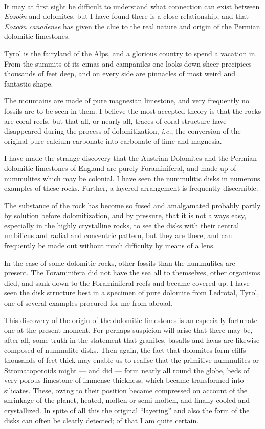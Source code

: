 \documentclass[a4paper, 12pt, oneside]{article}
\begin{document}
\paragraph{}
It may at first sight be difficult to understand what connection can exist between \emph{Eozoön} and dolomites, but I have found there is a close relationship, and that \emph{Eozoön canadense} has given the clue to the real nature and origin of the Permian dolomitic limestones.

Tyrol is the fairyland of the Alps, and a glorious country to spend a vacation in. From the summits of its cimas and campaniles one looks down sheer precipices thousands of feet deep, and on every side are pinnacles of most weird and fantastic shape.

The mountains are made of pure magnesian limestone, and very frequently no fossils are to be seen in them. I believe the most accepted theory is that the rocks are coral reefs, but that all, or nearly all, traces of coral structure have disappeared during the process of dolomitization, \emph{i.e.}, the conversion of the original pure calcium carbonate into carbonate of lime and magnesia.

I have made the strange discovery that the Austrian Dolomites and the Permian dolomitic limestones of England are purely Foraminiferal, and made up of nummulites which may be colonial. I have seen the nummulitic disks in numerous examples of these rocks. Further, a layered arrangement is frequently discernible.

The substance of the rock has become so fused and amalgamated probably partly by solution before dolomitization, and by pressure, that it is not always easy, especially in the highly crystalline rocks, to see the disks with their central umbilicus and radial and concentric pattern, but they are there, and can frequently be made out without much difficulty by means of a lens.

In the case of some dolomitic rocks, other fossils than the nummulites are present. The Foraminifera did not have the sea all to themselves, other organisms died, and sank down to the Foraminiferal reefs and became covered up. I have seen the disk structure best in a specimen of pure dolomite from Ledrotal, Tyrol, one of several examples procured for me from abroad.

This discovery of the origin of the dolomitic limestones is an especially fortunate one at the present moment. For perhaps suspicion will arise that there may be, after all, some truth in the statement that granites, basalts and lavas are likewise composed of nummulite disks. Then again, the fact that dolomites form cliffs thousands of feet thick may enable us to realise that the primitive nummulites or Stromatoporoids might --- and did --- form nearly all round the globe, beds of very porous limestone of immense thickness, which became transformed into silicates. These, owing to their position became compressed on account of the shrinkage of the planet, heated, molten or semi-molten, and finally cooled and crystallized. In spite of all this the original ``layering'' and also the form of the disks can often be clearly detected; of that I am quite certain.
\clearpage
\end{document}
